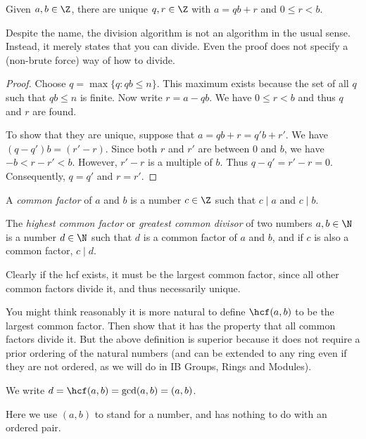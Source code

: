 \documentclass[a4paper]{article}
\begin{document}
\begin{thm}
  Given $a, b\in \Z$, there are unique $q, r\in \Z$ with $a = qb + r$ and $0\leq r < b$.
\end{thm}
Despite the name, the division algorithm is not an algorithm in the usual sense. Instead, it merely states that you can divide. Even the proof does not specify a (non-brute force) way of how to divide.

\begin{proof}
  Choose $q = \max\{q : qb \leq n\}$. This maximum exists because the set of all $q$ such that $qb\leq n$ is finite. Now write $r = a - qb$. We have $0\leq r < b$ and thus $q$ and $r$ are found.

  To show that they are unique, suppose that $a = qb + r = q'b + r'$. We have $(q - q')b = (r' - r)$. Since both $r$ and $r'$ are between $0$ and $b$, we have $-b < r - r' < b$. However, $r' - r$ is a multiple of $b$. Thus $q - q' = r' - r = 0$. Consequently, $q = q'$ and $r = r'$.
\end{proof}

\begin{defi}
  A \emph{common factor} of $a$ and $b$ is a number $c\in\Z$ such that $c\mid a$ and $c\mid b$.
\end{defi}

\begin{defi}
  The \emph{highest common factor} or \emph{greatest common divisor} of two numbers $a, b\in \N$ is a number $d\in \N$ such that $d$ is a common factor of $a$ and $b$, and if $c$ is also a common factor, $c\mid d$.
\end{defi}
Clearly if the hcf exists, it must be the largest common factor, since all other common factors divide it, and thus necessarily unique.

You might think reasonably it is more natural to define $\hcf(a, b)$ to be the largest common factor. Then show that it has the property that all common factors divide it. But the above definition is superior because it does not require a prior ordering of the natural numbers (and can be extended to any ring even if they are not ordered, as we will do in IB Groups, Rings and Modules).


\begin{notation}
  We write $d = \hcf(a, b) = \gcd(a, b) = (a, b)$.

  Here we use $(a, b)$ to stand for a number, and has nothing to do with an ordered pair.
\end{notation}
\end{document}
